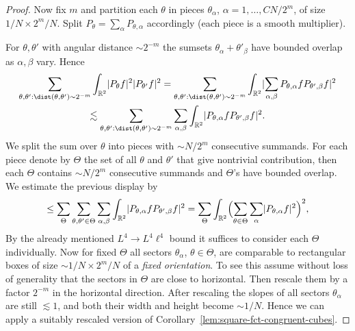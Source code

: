 \begin{proof}
Now fix $m$ and partition each $\theta$ in pieces $\theta_{\alpha}$, $\alpha = 1,\dotsc,CN/2^{m}$, of size $1/N \times 2^{m}/N$.
Split $P_{\theta} = \sum_{\alpha} P_{\theta,\alpha}$ accordingly (each piece is a smooth multiplier).
\begin{center}
\end{center}
For $\theta,\theta'$ with angular distance $\sim 2^{-m}$ the sumsets $\theta_{\alpha}+\theta'_{\beta}$ have bounded overlap as $\alpha,\beta$ vary.
Hence
\begin{multline*}
\sum_{\theta,\theta' : \dist(\theta,\theta') \sim 2^{-m}} \int_{\R^{2}} \abs{P_{\theta}f}^{2} \abs{P_{\theta'}f}^{2}
=
\sum_{\theta,\theta' : \dist(\theta,\theta') \sim 2^{-m}} \int_{\R^{2}} \abs{\sum_{\alpha,\beta} P_{\theta,\alpha}f P_{\theta',\beta}f}^{2}\\
\lesssim
\sum_{\theta,\theta' : \dist(\theta,\theta') \sim 2^{-m}} \sum_{\alpha,\beta} \int_{\R^{2}} \abs{P_{\theta,\alpha}f P_{\theta',\beta}f}^{2}.
\end{multline*}
We split the sum over $\theta$ into pieces with $\sim N/2^{m}$ consecutive summands.
For each piece denote by $\Theta$ the set of all $\theta$ and $\theta'$ that give nontrivial contribution, then each $\Theta$ contains $\sim N/2^{m}$ consecutive summands and $\Theta$'s have bounded overlap.
We estimate the previous display by
\[
\leq
\sum_{\Theta} \sum_{\theta,\theta' \in \Theta} \sum_{\alpha,\beta} \int_{\mathbb{R}^{2}} \lvert P_{\theta,\alpha}f P_{\theta',\beta}f\rvert^{2}
=
\sum_{\Theta} \int_{\mathbb{R}^{2}} \Bigl( \sum_{\theta \in \Theta} \sum_{\alpha} \lvert P_{\theta,\alpha}f\rvert^{2} \Bigr)^{2},
\]
By the already mentioned $L^{4} \to L^{4}\ell^{4}$ bound it suffices to consider each $\Theta$ individually.
Now for fixed $\Theta$ all sectors $\theta_{\alpha}$, $\theta \in \Theta$, are comparable to rectangular boxes of size $\sim 1/N \times 2^{m}/N$ of a \emph{fixed orientation}.
To see this assume without loss of generality that the sectors in $\Theta$ are close to horizontal.
Then rescale them by a factor $2^{-m}$ in the horizontal direction.
After rescaling the slopes of all sectors $\theta_{\alpha}$ are still $\lesssim 1$, and both their width and height become $\sim 1/N$.
Hence we can apply a suitably rescaled version of Corollary~\ref{lem:square-fct-congruent-cubes}.
\end{proof}

